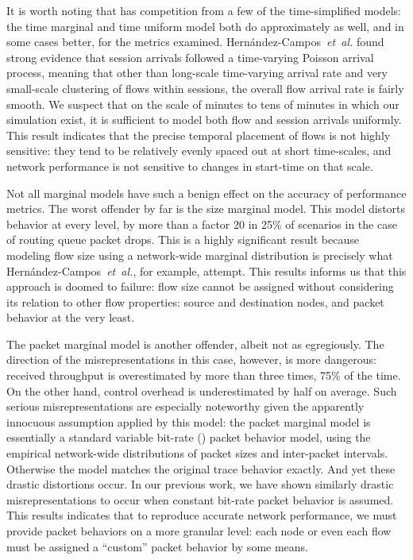 \documentclass[twocolumn,final]{svjour3}
\newcommand{\caps}[1]{{\smaller{#1}}}
\newcommand{\FHC}{Hern\'andez-Campos~\textit{et~al.}}
\newcommand{\model}[1]{\textsf{#1}}
\begin{document}
It is worth noting that \caps{GMM} has competition from a few of the time-simplified models: the \model{time marginal} and \model{time uniform} model both do approximately as well, and in some cases better, for the metrics examined. {\FHC} found strong evidence that session arrivals followed a time-varying Poisson arrival process, meaning that other than long-scale time-varying arrival rate and very small-scale clustering of flows within sessions, the overall flow arrival rate is fairly smooth. We suspect that on the scale of minutes to tens of minutes in which our simulation exist, it is sufficient to model both flow and session arrivals uniformly. This result indicates that the precise temporal placement of flows is not highly sensitive: they tend to be relatively evenly spaced out at short time-scales, and network performance is not sensitive to changes in start-time on that scale.

Not all marginal models have such a benign effect on the accuracy of performance metrics. The worst offender by far is the \model{size marginal} model. This model distorts behavior at every level, by more than a factor 20 in 25\% of scenarios in the case of routing queue packet drops. This is a highly significant result because modeling flow size using a network-wide marginal distribution is precisely what {\FHC}, for example, attempt. This results informs us that this approach is doomed to failure: flow size cannot be assigned without considering its relation to other flow properties: source and destination nodes, and packet behavior at the very least.

The \model{packet marginal} model is another offender, albeit not as egregiously. The direction of the misrepresentations in this case, however, is more dangerous: received throughput is overestimated by more than three times, 75\% of the time. On the other hand, \caps{AODV} control overhead is underestimated by half on average. Such serious misrepresentations are especially noteworthy given the apparently innocuous assumption applied by this model: the \model{packet marginal} model is essentially a standard variable bit-rate (\caps{VBR}) packet behavior model, using the empirical network-wide distributions of packet sizes and inter-packet intervals. Otherwise the model matches the original trace behavior exactly. And yet these drastic distortions occur. In our previous work, we have shown similarly drastic misrepresentations to occur when constant bit-rate packet behavior is assumed. This results indicates that to reproduce accurate network performance, we must provide packet behaviors on a more granular level: each node or even each flow must be assigned a ``custom'' packet behavior by some means.
\end{document}
